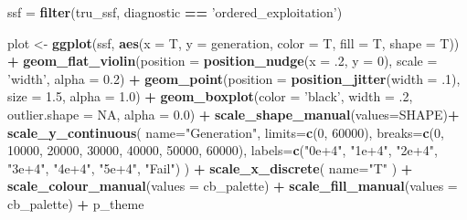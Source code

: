 \documentclass[]{book}
\newenvironment{Shaded}{\begin{snugshade}}{\end{snugshade}}
\newcommand{\DataTypeTok}[1]{\textcolor[rgb]{0.13,0.29,0.53}{#1}}
\newcommand{\DecValTok}[1]{\textcolor[rgb]{0.00,0.00,0.81}{#1}}
\newcommand{\FloatTok}[1]{\textcolor[rgb]{0.00,0.00,0.81}{#1}}
\newcommand{\KeywordTok}[1]{\textcolor[rgb]{0.13,0.29,0.53}{\textbf{#1}}}
\newcommand{\NormalTok}[1]{#1}
\newcommand{\OperatorTok}[1]{\textcolor[rgb]{0.81,0.36,0.00}{\textbf{#1}}}
\newcommand{\OtherTok}[1]{\textcolor[rgb]{0.56,0.35,0.01}{#1}}
\newcommand{\StringTok}[1]{\textcolor[rgb]{0.31,0.60,0.02}{#1}}
\begin{document}
\begin{Shaded}
\begin{Highlighting}[]
\NormalTok{ssf =}\StringTok{ }\KeywordTok{filter}\NormalTok{(tru_ssf, diagnostic }\OperatorTok{==}\StringTok{ 'ordered_exploitation'}\NormalTok{)}

\NormalTok{plot <-}\StringTok{ }\KeywordTok{ggplot}\NormalTok{(ssf, }\KeywordTok{aes}\NormalTok{(}\DataTypeTok{x =}\NormalTok{ T, }\DataTypeTok{y =}\NormalTok{ generation, }\DataTypeTok{color =}\NormalTok{ T, }\DataTypeTok{fill =}\NormalTok{ T, }\DataTypeTok{shape =}\NormalTok{ T)) }\OperatorTok{+}
\StringTok{  }\KeywordTok{geom_flat_violin}\NormalTok{(}\DataTypeTok{position =} \KeywordTok{position_nudge}\NormalTok{(}\DataTypeTok{x =} \FloatTok{.2}\NormalTok{, }\DataTypeTok{y =} \DecValTok{0}\NormalTok{), }\DataTypeTok{scale =} \StringTok{'width'}\NormalTok{, }\DataTypeTok{alpha =} \FloatTok{0.2}\NormalTok{) }\OperatorTok{+}
\StringTok{  }\KeywordTok{geom_point}\NormalTok{(}\DataTypeTok{position =} \KeywordTok{position_jitter}\NormalTok{(}\DataTypeTok{width =} \FloatTok{.1}\NormalTok{), }\DataTypeTok{size =} \FloatTok{1.5}\NormalTok{, }\DataTypeTok{alpha =} \FloatTok{1.0}\NormalTok{) }\OperatorTok{+}
\StringTok{  }\KeywordTok{geom_boxplot}\NormalTok{(}\DataTypeTok{color =} \StringTok{'black'}\NormalTok{, }\DataTypeTok{width =} \FloatTok{.2}\NormalTok{, }\DataTypeTok{outlier.shape =} \OtherTok{NA}\NormalTok{, }\DataTypeTok{alpha =} \FloatTok{0.0}\NormalTok{) }\OperatorTok{+}
\StringTok{  }\KeywordTok{scale_shape_manual}\NormalTok{(}\DataTypeTok{values=}\NormalTok{SHAPE)}\OperatorTok{+}
\StringTok{  }\KeywordTok{scale_y_continuous}\NormalTok{(}
    \DataTypeTok{name=}\StringTok{"Generation"}\NormalTok{,}
    \DataTypeTok{limits=}\KeywordTok{c}\NormalTok{(}\DecValTok{0}\NormalTok{, }\DecValTok{60000}\NormalTok{),}
    \DataTypeTok{breaks=}\KeywordTok{c}\NormalTok{(}\DecValTok{0}\NormalTok{, }\DecValTok{10000}\NormalTok{, }\DecValTok{20000}\NormalTok{, }\DecValTok{30000}\NormalTok{, }\DecValTok{40000}\NormalTok{, }\DecValTok{50000}\NormalTok{, }\DecValTok{60000}\NormalTok{),}
    \DataTypeTok{labels=}\KeywordTok{c}\NormalTok{(}\StringTok{"0e+4"}\NormalTok{, }\StringTok{"1e+4"}\NormalTok{, }\StringTok{"2e+4"}\NormalTok{, }\StringTok{"3e+4"}\NormalTok{, }\StringTok{"4e+4"}\NormalTok{, }\StringTok{"5e+4"}\NormalTok{, }\StringTok{"Fail"}\NormalTok{)}
\NormalTok{  ) }\OperatorTok{+}
\StringTok{  }\KeywordTok{scale_x_discrete}\NormalTok{(}
    \DataTypeTok{name=}\StringTok{"T"}
\NormalTok{  ) }\OperatorTok{+}
\StringTok{  }\KeywordTok{scale_colour_manual}\NormalTok{(}\DataTypeTok{values =}\NormalTok{ cb_palette) }\OperatorTok{+}
\StringTok{  }\KeywordTok{scale_fill_manual}\NormalTok{(}\DataTypeTok{values =}\NormalTok{ cb_palette) }\OperatorTok{+}
\StringTok{  }\NormalTok{p_theme}


\end{Highlighting}
\end{Shaded}
\end{document}
